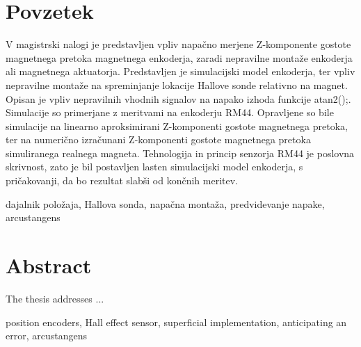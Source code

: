 \documentclass[a4paper,twoside,openright,12pt]{book}
\begin{document}
\chapter*{Povzetek}
V magistrski nalogi je predstavljen vpliv napačno merjene Z-komponente gostote magnetnega pretoka magnetnega enkoderja, zaradi nepravilne montaže enkoderja ali magnetnega aktuatorja.
Predstavljen je simulacijski model enkoderja, ter vpliv nepravilne montaže na spreminjanje lokacije Hallove sonde relativno na magnet.
Opisan je vpliv nepravilnih vhodnih signalov na napako izhoda funkcije atan2();.
Simulacije so primerjane z meritvami na enkoderju RM44. 
Opravljene so bile simulacije na linearno aproksimirani Z-komponenti gostote magnetnega pretoka, ter na numerično izračunani Z-komponenti gostote magnetnega pretoka simuliranega realnega magneta.
Tehnologija in princip senzorja RM44 je poslovna skrivnost, zato je bil postavljen lasten simulacijski model enkoderja, s pričakovanji, da bo rezultat  slabši od končnih meritev.

\kljucnebesede  dajalnik položaja, Hallova sonda, napačna montaža, predvidevanje napake, arcustangens
\chapter*{Abstract}

The thesis addresses ...

\keywords position encoders, Hall effect sensor, superficial implementation, anticipating an error, arcustangens




%
%


\end{document}
